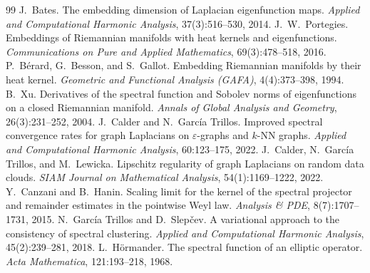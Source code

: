 \documentclass[review,supplement]{siamart220329}
\begin{document}
\begin{thebibliography}{99}
 J.~Bates. The embedding dimension of Laplacian
eigenfunction maps. \emph{Applied and Computational Harmonic Analysis},
37(3):516--530, 2014.
 J.~W.~Portegies. Embeddings of Riemannian manifolds
with heat kernels and eigenfunctions. \emph{Communications on Pure and Applied
Mathematics}, 69(3):478--518, 2016.
 P.~B\'erard, G.~Besson, and S.~Gallot. Embedding
Riemannian manifolds by their heat kernel. \emph{Geometric and Functional
Analysis (GAFA)}, 4(4):373--398, 1994.
 B.~Xu. Derivatives of the spectral function and Sobolev norms
of eigenfunctions on a closed Riemannian manifold. \emph{Annals of Global
Analysis and Geometry}, 26(3):231--252, 2004.
 J.~Calder and N.~Garc\'ia Trillos. Improved spectral
convergence rates for graph Laplacians on $\varepsilon$-graphs and $k$-NN graphs.
\emph{Applied and Computational Harmonic Analysis}, 60:123--175, 2022.
 J.~Calder, N.~Garc\'ia Trillos, and
M.~Lewicka. Lipschitz regularity of graph Laplacians on random data clouds.
\emph{SIAM Journal on Mathematical Analysis}, 54(1):1169--1222, 2022.
 Y.~Canzani and B.~Hanin. Scaling limit for the
kernel of the spectral projector and remainder estimates in the pointwise Weyl
law. \emph{Analysis \& PDE}, 8(7):1707--1731, 2015.
 N.~Garc\'ia Trillos and D.~Slep\v{c}ev. A
variational approach to the consistency of spectral clustering. \emph{Applied
and Computational Harmonic Analysis}, 45(2):239--281, 2018.
 L.~H\"ormander. The spectral function of an
elliptic operator. \emph{Acta Mathematica}, 121:193--218, 1968.
\end{thebibliography}
\end{document}
